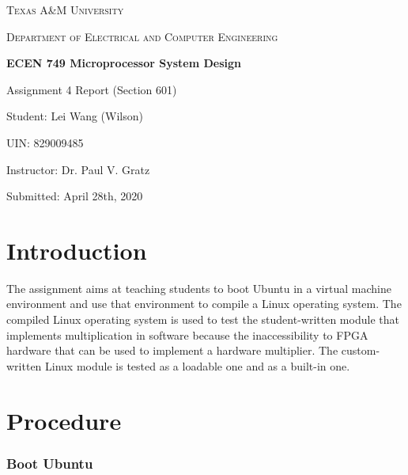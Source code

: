 \documentclass[11pt,letterpaper,titlepage]{article}
\begin{document}
\begin{titlepage}
  \centering
	{\scshape\large Texas A\&M University \par}
	\vspace{1cm}
	{\scshape\Large Department of Electrical and Computer Engineering \par}
	\vspace{4cm}
    \vspace{0.5cm}
	{\huge\bfseries ECEN 749 Microprocessor System Design\par}
	\vspace{4cm}
	{\Large Assignment 4 Report (Section 601)\par}
	\vspace{1cm}
	{\Large Student: Lei Wang (Wilson)\par}
	\vspace{1cm}
	{\Large UIN: 829009485\par}
	\vspace{1cm}
	{\Large Instructor: Dr. Paul V. Gratz\par}
	\vspace{4cm}
	\vfill

	{\large Submitted: April 28th, 2020 \par}

\end{titlepage}

\newpage

\tableofcontents{}

\newpage

\part{Introduction}

The assignment aims at teaching students to boot Ubuntu in a virtual machine environment and use that environment to compile a Linux operating system. The compiled Linux operating system is used to test the student-written module that implements multiplication in software because the inaccessibility to FPGA hardware that can be used to implement a hardware multiplier. The custom-written Linux module is tested as a loadable one and as a built-in one.

\part{Procedure}

\section{Boot Ubuntu}
\end{document}
